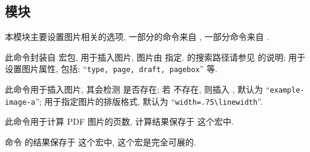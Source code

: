\clearpage
\subsection{ 模块}
本模块主要设置图片相关的选项, 一部分的命令来自 , 一部分命令来自 .


\begin{DocExample}[++]
  \graphicspath{
    {./Fig/}{./Img/}
  }
\end{DocExample}



\begin{function}[added=2025-09-20]{\zgraphicsinclude}
  \begin{syntax}
    \cmd{\zgraphicsinclude}
  \end{syntax}
  此命令封装自  宏包, 用于插入图片, 图片由 
  指定.  的搜索路径请参见 \cmd{\graphicspath} 的说明; 
   用于设置图片属性, 包括: ``\texttt{type, page, draft, pagebox}'' 等.
\end{function}


\begin{function}[added=2026-02-16]{}
	\begin{syntax}
  \end{syntax}
  此命令用于插入图片, 其会检测  是否存在; 若  不存在, 则插入 ,
   默认为 ``\texttt{example-image-a}'';  用于指定图片的排版格式,
  默认为 ``\texttt{width=.75\textbackslash linewidth}''.
\end{function}


\begin{function}[added=2025-09-20]{\zgraphicspagecnt}
  \begin{syntax}
  \cmd{\zgraphicspagecnt}
  \end{syntax}
  此命令用于计算 PDF 图片的页数, 计算结果保存于 \cmd{\zgraphicspageint} 这个宏中.
\end{function}


\begin{function}[added=2025-09-20, EXP]{\zgraphicspageint}
  命令 \cmd{\zgraphicspagecnt} 的结果保存于 \cmd{\zgraphicspageint} 这个宏中, 这个宏是完全可展的.
\end{function}
